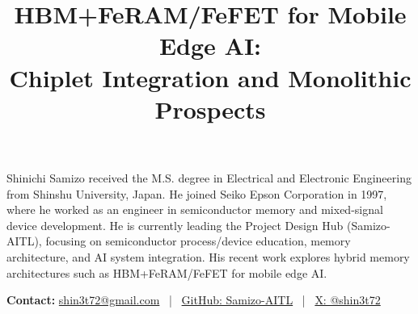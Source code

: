 \documentclass[10pt,conference]{IEEEtran}
\title{HBM+FeRAM/FeFET for Mobile Edge AI:\\
Chiplet Integration and Monolithic Prospects}
\author{
  \IEEEauthorblockN{Shinichi Samizo}
  \IEEEauthorblockA{Project Design Hub (Samizo-AITL), Japan\\
  Email: \href{mailto:shin3t72@gmail.com}{shin3t72@gmail.com}}
}
\begin{document}
\maketitle










\begin{IEEEbiography}[{}]{Shinichi Samizo}
received the M.S. degree in Electrical and Electronic Engineering from Shinshu University, Japan.
He joined Seiko Epson Corporation in 1997, where he worked as an engineer in semiconductor memory and mixed-signal device development.
He is currently leading the Project Design Hub (Samizo-AITL), focusing on semiconductor process/device education, memory architecture, and AI system integration.
His recent work explores hybrid memory architectures such as HBM+FeRAM/FeFET for mobile edge AI.

\textbf{Contact:}
\href{mailto:shin3t72@gmail.com}{shin3t72@gmail.com} \,
| \, \href{https://github.com/Samizo-AITL}{GitHub: Samizo-AITL} \,
| \, \href{https://x.com/shin3t72}{X: @shin3t72}
\end{IEEEbiography}
\end{document}
